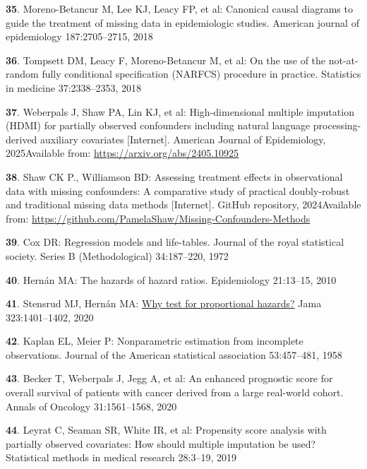 \documentclass[
  letterpaper,
  DIV=11,
  numbers=noendperiod]{scrartcl}
\newlength{\cslhangindent}
\newenvironment{CSLReferences}[2] %
 {\begin{list}{}{%
  \setlength{\itemindent}{0pt}
  \setlength{\leftmargin}{0pt}
  \setlength{\parsep}{0pt}
  \ifodd #1
   \setlength{\leftmargin}{\cslhangindent}
   \setlength{\itemindent}{-1\cslhangindent}
  \fi
  \setlength{\itemsep}{#2\baselineskip}}}
 {\end{list}}
\begin{document}
\begin{CSLReferences}{0}{1}
\textbf{35}. Moreno-Betancur M, Lee KJ, Leacy FP, et al: Canonical
causal diagrams to guide the treatment of missing data in epidemiologic
studies. American journal of epidemiology 187:2705--2715, 2018

\textbf{36}. Tompsett DM, Leacy F, Moreno-Betancur M, et al: On the use
of the not-at-random fully conditional specification (NARFCS) procedure
in practice. Statistics in medicine 37:2338--2353, 2018

\textbf{37}. Weberpals J, Shaw PA, Lin KJ, et al: High-dimensional
multiple imputation (HDMI) for partially observed confounders including
natural language processing-derived auxiliary covariates {[}Internet{]}.
American Journal of Epidemiology, 2025Available from:
\url{https://arxiv.org/abs/2405.10925}

\textbf{38}. Shaw CK P., Williamson BD: Assessing treatment effects in
observational data with missing confounders: A comparative study of
practical doubly-robust and traditional missing data methods
{[}Internet{]}. GitHub repository, 2024Available from:
\url{https://github.com/PamelaShaw/Missing-Confounders-Methods}

\textbf{39}. Cox DR: Regression models and life-tables. Journal of the
royal statistical society. Series B (Methodological) 34:187--220, 1972

\textbf{40}. Hernán MA: The hazards of hazard ratios. Epidemiology
21:13--15, 2010

\textbf{41}. Stensrud MJ, Hernán MA:
\href{https://doi.org/10.1001/jama.2020.1267}{Why test for proportional
hazards?} Jama 323:1401--1402, 2020

\textbf{42}. Kaplan EL, Meier P: Nonparametric estimation from
incomplete observations. Journal of the American statistical association
53:457--481, 1958

\textbf{43}. Becker T, Weberpals J, Jegg A, et al: An enhanced
prognostic score for overall survival of patients with cancer derived
from a large real-world cohort. Annals of Oncology 31:1561--1568, 2020

\textbf{44}. Leyrat C, Seaman SR, White IR, et al: Propensity score
analysis with partially observed covariates: How should multiple
imputation be used? Statistical methods in medical research 28:3--19,
2019


\end{CSLReferences}
\end{document}
